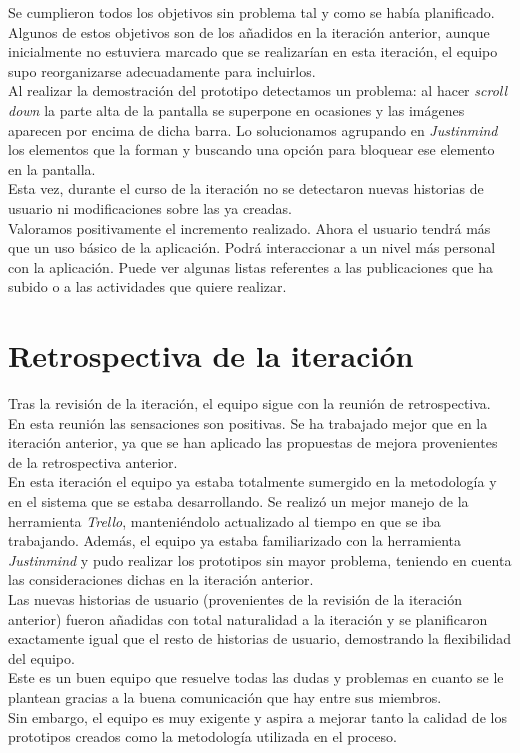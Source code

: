 \documentclass[11pt]{article}
\begin{document}
Se cumplieron todos los objetivos sin problema tal y como se había planificado. Algunos de estos objetivos son de los añadidos en la iteración anterior, aunque inicialmente no estuviera marcado que se realizarían en esta iteración, el equipo supo reorganizarse adecuadamente para incluirlos.\\

Al realizar la demostración del prototipo detectamos un problema: al hacer \textit{scroll down} la parte alta de la pantalla se superpone en ocasiones y las imágenes aparecen por encima de dicha barra. Lo solucionamos agrupando en \textit{Justinmind} los elementos que la forman y buscando una opción para bloquear ese elemento en la pantalla.\\

Esta vez, durante el curso de la iteración no se detectaron nuevas historias de usuario ni modificaciones sobre las ya creadas.\\

Valoramos positivamente el incremento realizado. Ahora el usuario tendrá más que un uso básico de la aplicación. Podrá interaccionar a un nivel más personal con la aplicación. Puede ver algunas listas referentes a las publicaciones que ha subido o a las actividades que quiere realizar.
\newpage

\section*{Retrospectiva de la iteración}
Tras la revisión de la iteración, el equipo sigue con la reunión de retrospectiva. En esta reunión las sensaciones son positivas. Se ha trabajado mejor que en la iteración anterior, ya que se han aplicado las propuestas de mejora provenientes de la retrospectiva anterior.\\

En esta iteración el equipo ya estaba totalmente sumergido en la metodología y en el sistema que se estaba desarrollando. Se realizó un mejor manejo de la herramienta \textit{Trello}, manteniéndolo actualizado al tiempo en que se iba trabajando. Además, el equipo ya estaba familiarizado con la herramienta \textit{Justinmind} y pudo realizar los prototipos sin mayor problema, teniendo en cuenta las consideraciones dichas en la iteración anterior.\\

Las nuevas historias de usuario (provenientes de la revisión de la iteración anterior) fueron añadidas con total naturalidad a la iteración y se planificaron exactamente igual que el resto de historias de usuario, demostrando la flexibilidad del equipo.\\

Este es un buen equipo que resuelve todas las dudas y problemas en cuanto se le plantean gracias a la buena comunicación que hay entre sus miembros.\\ 

Sin embargo, el equipo es muy exigente y aspira a mejorar tanto la calidad de los prototipos creados como la metodología utilizada en el proceso.
\end{document}
